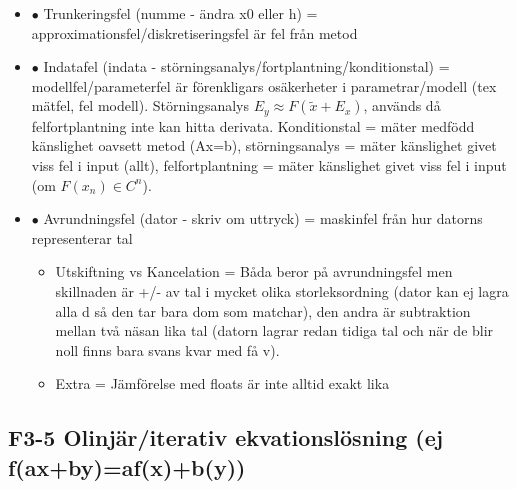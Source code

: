 \documentclass[a4paper]{article}
\begin{document}
\begin{itemize}[label={}, leftmargin=1.5em, parsep=0pt, itemsep=0pt]
\begin{itemize}
        \item Ex: $123,456\pm 0,009$ v=3, g=2, d=1 (härled d med formeln ovan och testa d)
        \\
    \end{itemize}
    \item $\bullet$ Trunkeringsfel (numme - ändra x0 eller h) = approximationsfel/diskretiseringsfel är fel från metod
    \item $\bullet$ Indatafel (indata - störningsanalys/fortplantning/konditionstal) = modellfel/parameterfel är förenkligars osäkerheter i parametrar/modell (tex mätfel, fel modell). Störningsanalys $E_y \approx F(\tilde{x}+E_x)$, används då felfortplantning inte kan hitta derivata. Konditionstal = mäter medfödd känslighet oavsett metod (Ax=b), störningsanalys = mäter känslighet givet viss fel i input (allt), felfortplantning = mäter känslighet givet viss fel i input (om $F(x_n)\in C^n$).
    \item $\bullet$ Avrundningsfel (dator - skriv om uttryck) = maskinfel från hur datorns representerar tal
    \begin{itemize}
        \item Utskiftning vs Kancelation = Båda beror på avrundningsfel men skillnaden är +/- av tal i mycket olika storleksordning (dator kan ej lagra alla d så den tar bara dom som matchar), den andra är subtraktion mellan två näsan lika tal (datorn lagrar redan tidiga tal och när de blir noll finns bara svans kvar med få v).
        \item Extra = Jämförelse med floats är inte alltid exakt lika
    \end{itemize}
\end{itemize}

\subsection{F3-5 Olinjär/iterativ ekvationslösning (ej f(ax+by)=af(x)+b(y))}
\end{document}
